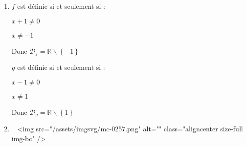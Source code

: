 \begin{corrige}
     \begin{enumerate}
          \item
          $f$ est définie si et seulement si :
          \par
          $x+1\neq 0$
          \par
          $x\neq -1$
          \par
          Donc $\mathscr D_{f}=\mathbb{R}\backslash\left\{-1\right\}$
          \par
          $g$ est définie si et seulement si :
          \par
          $x-1\neq 0$
          \par
          $x\neq 1$
          \par
          Donc $\mathscr D_{g}=\mathbb{R}\backslash\left\{1\right\}$
          \item
          ~
          <img src="/assets/imgsvg/mc-0257.png" alt="" class="aligncenter size-full  img-bc" />


\end{enumerate}
\end{corrige}
